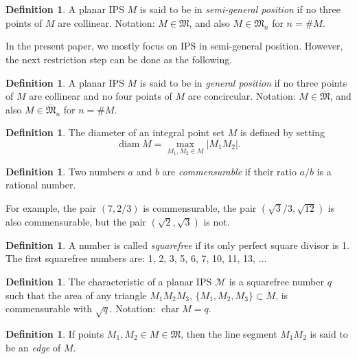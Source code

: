 \documentclass[a4paper,14pt]{article} %
\theoremstyle{plain}
\theoremstyle{definition}
\newtheorem{definition}[theorem]{Definition}
\DeclareMathOperator{\chr}{char}
\begin{document}
\begin{definition}
	\label{def:IPS_semi_general}
	A planar IPS $M$ is said to be in \emph{semi-general position}
	if no three points of $M$ are collinear.
	Notation: $M\in\dot{\mathfrak{M}}$, and also $M\in\dot{\mathfrak{M}}_n$ for $n=\#M$.
\end{definition}

In the present paper, we mostly focus on IPS in semi-general position.
However, the next restriction step can be done as the following.

\begin{definition}
	\label{def:IPS_general}
	A planar IPS $M$ is said to be in \emph{general position}
	if no three points of $M$ are collinear
	and no four points of $M$ are concircular.
	Notation: $M\in\overline{\mathfrak{M}}$, and also $M\in\overline{\mathfrak{M}}_n$ for $n=\#M$.
\end{definition}

\begin{definition}
	The diameter of an integral point set $M$ is defined by setting
	\begin{equation}
		\operatorname{diam} M = \underset{M_{1}, M_{2} \in
		M}{\max} |M_{1}M_{2}|
		.
	\end{equation}
\end{definition}

\begin{definition}
	Two numbers $a$ and $b$ are \emph{commensurable} if their ratio $a/b$
	is a rational number.
\end{definition}

For example, the pair $(7, 2/3)$ is commensurable,
the pair $(\sqrt3/3, \sqrt{12})$ is also commensurable,
but the pair $(\sqrt2, \sqrt3)$ is not.

\begin{definition}
	A number is called \emph{squarefree} if its only perfect square divisor is 1.
	The first squarefree numbers are: 1, 2, 3, 5, 6, 7, 10, 11, 13, ...
\end{definition}


\begin{definition}
	The characteristic of a planar IPS $\mathcal{M}$ is a squarefree number $q$
	such that the area of any triangle $M_1M_2M_3$, $\{M_1,M_2,M_3\}\subset M$,
	is commensurable with $\sqrt{q}$.
	Notation: $\chr M = q$.
\end{definition}

\begin{definition}
	If points $M_1, M_2 \in M \in \mathfrak{M}$,
	then the line segment $M_1 M_2$ is said to be an \emph{edge} of $M$.
\end{definition}
\end{document}
